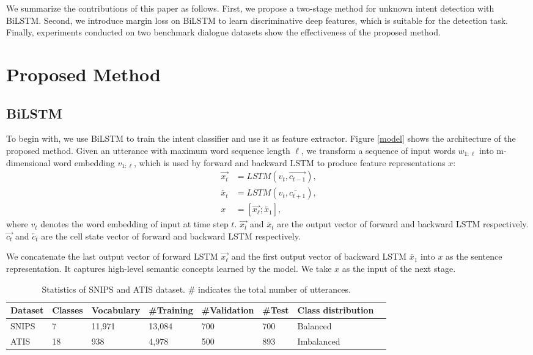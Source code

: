\documentclass[11pt,a4paper]{article}
\begin{document}
We summarize the contributions of this paper as follows. First, we propose a two-stage method for unknown intent detection with BiLSTM. Second, we introduce margin loss on BiLSTM to learn discriminative deep features, which is suitable for the detection task. Finally, experiments conducted on two benchmark dialogue datasets show the effectiveness of the proposed method. 

\section{Proposed Method}
\subsection{BiLSTM}
To begin with, we use BiLSTM \cite{mesnil2015using} to train the intent classifier and use it as feature extractor. Figure \ref{model} shows the architecture of the proposed method. Given an utterance with maximum word sequence length $\ell $, we transform a sequence of input words $w_{1:\ell}$ into m-dimensional word embedding $v_{1:\ell}$, which is used by forward and backward LSTM to produce feature representations $x$: 
\begin{align}
\overrightarrow{x_t} &= LSTM(v_t,\overrightarrow{c_{t-1}}), \nonumber \\
\overleftarrow{x_t} &= LSTM(v_t,\overleftarrow{c_{t+1}}), \nonumber \\
x &=[\overrightarrow{x_{\ell}};\overleftarrow{x_{1}}], 
\end{align} 
where $v_{t}$ denotes the word embedding of input at time step $t$. $\overrightarrow{x_{t}}$ and $\overleftarrow{x_{t}}$ are the output vector of forward and backward LSTM respectively.  $\overrightarrow{c_{t}}$ and $\overleftarrow{c_{t}}$ are the cell state vector of forward and backward LSTM respectively.

We concatenate the last output vector of forward LSTM ${\overrightarrow{x_{\ell}}}$ and the first output vector of backward LSTM $\overleftarrow{x_{1}}$ into $x$ as the sentence representation. It captures high-level semantic concepts learned by the model. We take $x$ as the input of the next stage. 

\begin{table*}[t!]
\centering
\begin{tabular}{llllllll}
\toprule
  Dataset & Classes & Vocabulary & \#Training & \#Validation & \#Test & Class distribution \\
  \hline
  SNIPS & 7 & 11,971 & 13,084 & 700 & 700 & Balanced \\
  ATIS & 18 & 938 & 4,978 & 500 & 893 & Imbalanced\\
\bottomrule
\end{tabular}
\caption{ \label{data-stat-table}  Statistics of SNIPS and ATIS dataset. \# indicates the total number of utterances.}
\end{table*}
\end{document}
